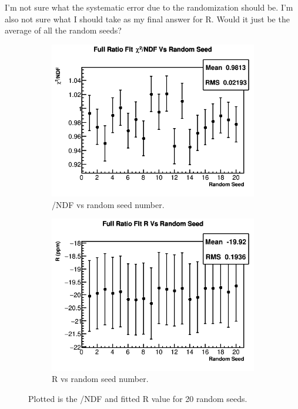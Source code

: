 I'm not sure what the systematic error due to the randomization should be. I'm also not sure what I should take as my final answer for R. Would it just be the average of all the random seeds?

\begin{figure}[]
\centering
    \begin{subfigure}[t]{0.45\textwidth}
	    \centering
		\includegraphics[width=\textwidth]{RatioCBO_Chi2NDF_Vs_Iter_Canv}
	    \caption{\chisq/NDF vs random seed number.}
    \end{subfigure}
    \begin{subfigure}[t]{0.45\textwidth}
	    \centering
		\includegraphics[width=\textwidth]{RatioCBO_R_Vs_Iter_Canv}
	    \caption{R vs random seed number.}
    \end{subfigure}%
\caption[RandomSeeds]{Plotted is the \chisq/NDF and fitted R value for 20 random seeds.}
\label{fig:RandomSeeds}
\end{figure}

